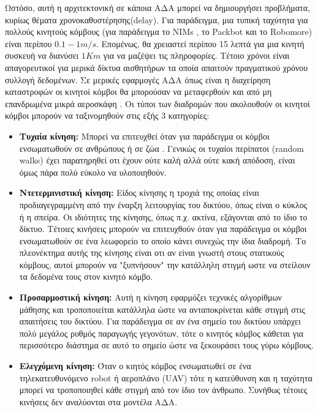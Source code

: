 Ωστόσο, αυτή η αρχιτεκτονική σε κάποια ΑΔΑ μπορεί να δημιουργήσει προβλήματα, κυρίως θέματα χρονοκαθυστέρησης(delay). Για παράδειγμα, μια τυπική ταχύτητα για πολλούς
κινητούς κόμβους (για παράδειγμα το NIMs \cite{nims_mobile}, το Packbot\cite{dynamic_deadlines} και το Robomore\cite{robomore_mobile}) είναι περίπου $0.1-1m/s$.
Επομένως, θα χρειαστεί περίπου 15 λεπτά για μια κινητή συσκευή να διανύσει $1Km$ για να μαζέψει τις πληροφορίες. Τέτοιο χρόνοι είναι απαγορευτικοί για μερικά δίκτυα
αισθητήρων τα οποία απαιτούν πραγματικού χρόνου συλλογή δεδομένων. Σε μερικές εφαρμογές ΑΔΑ όπως είναι η διαχείρηση καταστροφών οι κινητοί κόμβοι θα μπορούσαν να
μεταφερθούν και από μη επανδρωμένα μικρά αεροσκάφη \cite{uav_mobile}. Οι τύποι των διαδρομών που ακολουθούν οι κινητοί κόμβοι μπορούν να ταξινομηθούν στις εξής 3
κατηγορίες:

\begin{itemize}
\item \textbf{Τυχαία κίνηση:} Μπορεί να επιτευχθεί όταν για παράδειγμα οι κόμβοι ενσωματωθούν σε ανθρώπους ή σε ζώα \cite{zebranet}. Γενικώς οι τυχαίοι περίπατοι
(random walks) έχει παρατηρηθεί οτι έχουν ούτε καλή αλλά ούτε κακή απόδοση, είναι όμως πάρα πολύ εύκολο να υλοποιηθούν.

\item \textbf{Ντετερμινιστική κίνηση:} Είδος κίνησης η τροχιά της οποίας είναι προδιαγεγραμμένη από την έναρξη λειτουργίας του δικτύου, όπως είναι ο κύκλος ή η
σπείρα. Οι ιδιότητες της κίνησης, όπως π.χ. ακτίνα, εξάγονται από το ίδιο το δίκτυο. Τέτοιες κινήσεις μπορούν να επιτευχθούν όταν για παράδειγμα οι κόμβοι
ενσωματωθούν σε ένα λεωφορείο το οποίο κάνει συνεχώς την ίδια διαδρομή. Το πλεονέκτημα αυτής της κίνησης είναι οτι αν είναι γνωστή στους στατικούς κόμβους, αυτοί
μπορούν να "ξυπνήσουν" την κατάλληλη στιγμή ωστε να στείλουν τα δεδομένα τους στον κινητό κόμβο.

\item \textbf{Προσαρμοστική κίνηση:} Αυτή η κίνηση εφαρμόζει τεχνικές αλγορίθμων μάθησης και τροποποιείται κατάλληλα ώστε να ανταποκρίνεται κάθε στιγμή στις
απαιτήσεις του δικτύου. Για παράδειγμα σε αν ένα σημείο του δικτύου υπάρχει πολύ μεγάλος ρυθμός παραγωγής γεγονότων, τότε ο κινητός κόμβος κάθεται για περισσότερο
διάστημα σε αυτό το σημείο ώστε να ξεκουράσει τους γύρω κόμβους.

\item \textbf{Ελεγχόμενη κίνηση:} Όταν ο κιητός κόμβος ενσωματωθεί σε ένα τηλεκατευθυνόμενο robot ή αεροπλάνο (UAV) τότε η κατεύθυνση και η ταχύτητα μπορεί να
τροποποιηθεί κάθε στιγμή από τον ίδιο τον άνθρωπο. Συνήθως τέτοιες κινήσεις δεν αναλύονται στα μοντέλα ΑΔΑ.
\end{itemize}



